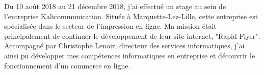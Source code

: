	Du 10 août 2018 au 21 décembre 2018, j'ai effectué un stage au sein de l'entreprise Kalicommunication.
	Située à Marquette-Lez-Lille, cette entreprise est spécialisée dans le secteur de l'impression en ligne.\newline
	Ma mission était principalement de continuer le développement de leur site internet, "Rapid-Flyer".
	Accompagné par Christophe Lenoir, directeur des services informatiques, j'ai ainsi pu développer mes compétences informatiques en entreprise et découvrir le fonctionnement d'un commerce en ligne.